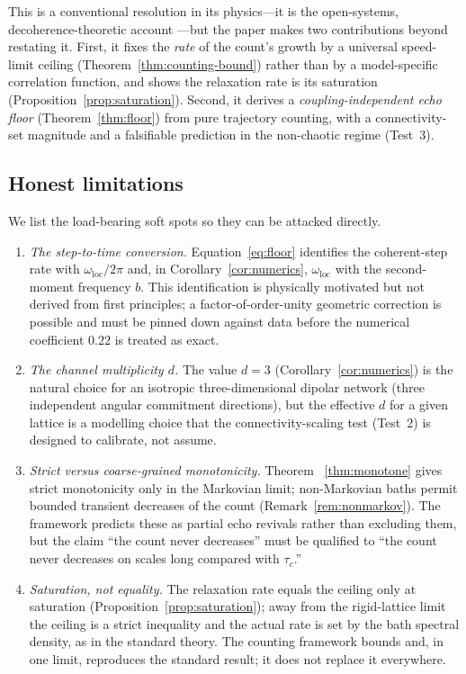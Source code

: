 \documentclass[twocolumn,10pt,a4paper]{article}
\theoremstyle{thmstyle}
\theoremstyle{definition}
\theoremstyle{remark}
\begin{document}
This is a conventional resolution in its physics---it is the open-systems,
decoherence-theoretic account \citep{zurek2003,breuer2002}---but the paper
makes two contributions beyond restating it. First, it fixes the
\emph{rate} of the count's growth by a universal speed-limit ceiling
(Theorem~\ref{thm:counting-bound}) rather than by a model-specific
correlation function, and shows the relaxation rate is its saturation
(Proposition~\ref{prop:saturation}). Second, it derives a
\emph{coupling-independent echo floor} (Theorem~\ref{thm:floor}) from pure
trajectory counting, with a connectivity-set magnitude and a falsifiable
prediction in the non-chaotic regime (Test~3).

\subsection{Honest limitations}

We list the load-bearing soft spots so they can be attacked directly.
\begin{enumerate}[leftmargin=1.5em,itemsep=0.2em]
\item \emph{The step-to-time conversion.} Equation~\eqref{eq:floor}
identifies the coherent-step rate with $\omega_{\mathrm{loc}}/2\pi$ and,
in Corollary~\ref{cor:numerics}, $\omega_{\mathrm{loc}}$ with the
second-moment frequency $b$. This identification is physically motivated
but not derived from first principles; a factor-of-order-unity geometric
correction is possible and must be pinned down against data before the
numerical coefficient $0.22$ is treated as exact.
\item \emph{The channel multiplicity $d$.} The value $d=3$
(Corollary~\ref{cor:numerics}) is the natural choice for an isotropic
three-dimensional dipolar network (three independent angular commitment
directions), but the effective $d$ for a given lattice is a modelling
choice that the connectivity-scaling test (Test~2) is designed to
calibrate, not assume.
\item \emph{Strict versus coarse-grained monotonicity.} Theorem~%
\ref{thm:monotone} gives strict monotonicity only in the Markovian limit;
non-Markovian baths permit bounded transient decreases of the count
(Remark~\ref{rem:nonmarkov}). The framework predicts these as partial echo
revivals rather than excluding them, but the claim ``the count never
decreases'' must be qualified to ``the count never decreases on scales long
compared with $\tau_{c}$.''
\item \emph{Saturation, not equality.} The relaxation rate equals the
ceiling only at saturation (Proposition~\ref{prop:saturation}); away from
the rigid-lattice limit the ceiling is a strict inequality and the actual
rate is set by the bath spectral density, as in the standard theory. The
counting framework bounds and, in one limit, reproduces the standard
result; it does not replace it everywhere.
\end{enumerate}
\end{document}
